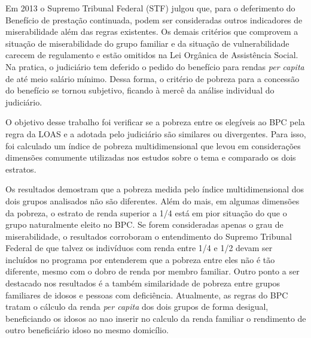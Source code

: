 \documentclass[
	12pt,				%
	openright,			%
	twoside,			%
	a4paper,			%
	english,			%
	french,				%
	spanish,			%
	brazil				%
	]{abntex2}
\begin{document}
Em 2013 o Supremo Tribunal Federal (STF) julgou que, para o deferimento do
Benefício de prestação continuada, podem ser consideradas outros indicadores de miserabilidade além das regras existentes. Os demais critérios que comprovem a situação de miserabilidade do grupo familiar e da situação de vulnerabilidade carecem de regulamento e estão omitidos na Lei Orgânica de Assistência Social. Na pratica, o judiciário tem deferido o pedido do benefício para rendas \textit{per capita} de até meio salário mínimo. Dessa forma, o critério de pobreza para a concessão do benefício se tornou subjetivo, ficando à mercê da análise individual do judiciário.

O objetivo desse trabalho foi verificar se a pobreza entre os elegíveis ao BPC pela regra da LOAS e a adotada pelo judiciário são similares ou divergentes. Para isso, foi calculado um índice de pobreza multidimensional que levou em considerações dimensões comumente utilizadas nos estudos sobre o tema e comparado os dois estratos. 

Os resultados demostram que a pobreza medida pelo índice multidimensional dos dois grupos analisados não são diferentes. Além do mais, em algumas dimensões da pobreza, o estrato de renda superior a 1/4 está em pior situação do que o grupo naturalmente eleito no BPC. Se forem consideradas apenas o grau de miserabilidade, o resultados corroboram o entendimento do Supremo Tribunal Federal de que talvez os indivíduos com renda entre 1/4 e 1/2 devam ser incluídos no programa por entenderem que a pobreza entre eles não é tão diferente, mesmo com o dobro de renda por membro familiar. Outro ponto a ser destacado nos resultados é a também similaridade de pobreza entre grupos familiares de idosos e pessoas com deficiência. Atualmente, as regras do BPC tratam o cálculo da renda \textit{per capita} dos dois grupos de forma desigual, beneficiando os idosos ao nao inserir no calculo da renda familiar o rendimento de outro beneficiário idoso no mesmo domicílio. 





\postextual


\end{document}
